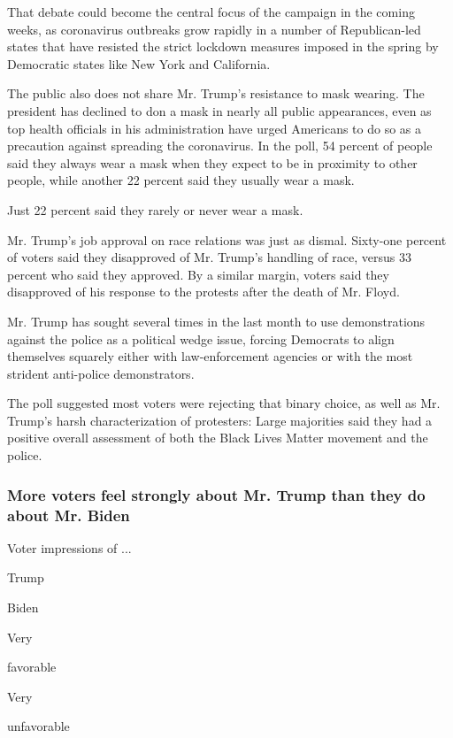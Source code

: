 That debate could become the central focus of the campaign in the coming
weeks, as coronavirus outbreaks grow rapidly in a number of
Republican-led states that have resisted the strict lockdown measures
imposed in the spring by Democratic states like New York and California.

The public also does not share Mr. Trump's resistance to mask wearing.
The president has declined to don a mask in nearly all public
appearances, even as top health officials in his administration have
urged Americans to do so as a precaution against spreading the
coronavirus. In the poll, 54 percent of people said they always wear a
mask when they expect to be in proximity to other people, while another
22 percent said they usually wear a mask.

Just 22 percent said they rarely or never wear a mask.

Mr. Trump's job approval on race relations was just as dismal. Sixty-one
percent of voters said they disapproved of Mr. Trump's handling of race,
versus 33 percent who said they approved. By a similar margin, voters
said they disapproved of his response to the protests after the death of
Mr. Floyd.

Mr. Trump has sought several times in the last month to use
demonstrations against the police as a political wedge issue, forcing
Democrats to align themselves squarely either with law-enforcement
agencies or with the most strident anti-police demonstrators.

The poll suggested most voters were rejecting that binary choice, as
well as Mr. Trump's harsh characterization of protesters: Large
majorities said they had a positive overall assessment of both the Black
Lives Matter movement and the police.

\hypertarget{more-voters-feel-strongly-about-mr-trump-than-they-do-about-mr-biden}{%
\subsubsection{More voters feel strongly about Mr. Trump than they do
about Mr.
Biden}\label{more-voters-feel-strongly-about-mr-trump-than-they-do-about-mr-biden}}

Voter impressions of ...

Trump

Biden

Very

favorable

Very

unfavorable

